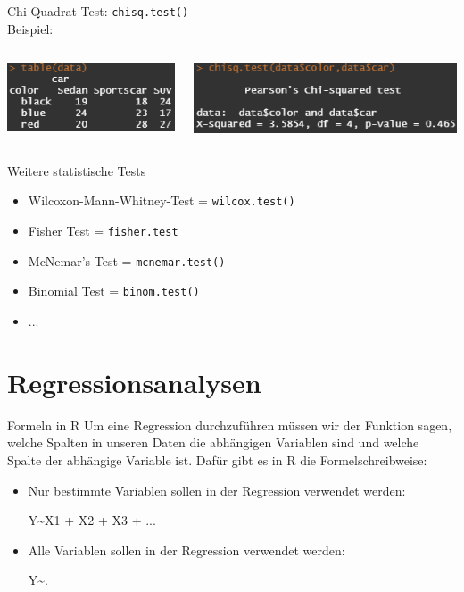 \documentclass[xcolor=dvipsnames, aspectratio = 169]{beamer}
\begin{document}
\begin{frame}[fragile]{Chi-Quadrat Test:}	
	\verb +chisq.test()+ \\

	Beispiel: \\
	\begin{columns}[T]
		\begin{column}{0.4\textwidth}
			\includegraphics{tabledata}
		\end{column}
		\begin{column}{0.6\textwidth}
			\includegraphics{chisq}
		\end{column}
	\end{columns}
\end{frame}


\begin{frame}[fragile]{Weitere statistische Tests}
	\begin{itemize}
		\item Wilcoxon-Mann-Whitney-Test = \verb+wilcox.test()+
		\item Fisher Test = \verb+fisher.test+
		\item McNemar's Test = \verb+mcnemar.test()+
		\item Binomial Test = \verb+binom.test()+
		\item ...
	\end{itemize}
\end{frame}

\section{Regressionsanalysen}

\begin{frame}[fragile]{Formeln in R}
	Um eine Regression durchzuführen müssen wir der Funktion sagen, welche Spalten in unseren Daten die abhängigen Variablen sind und welche Spalte der abhängige Variable ist. Dafür gibt 	es in R die Formelschreibweise:
	\begin{itemize}
		\item Nur bestimmte Variablen sollen in der Regression verwendet werden:
			\begin{center}
				Y\textasciitilde X1 + X2 + X3 + ... 
			\end{center}
		\item Alle Variablen sollen in der Regression verwendet werden:
			\begin{center}
				Y\textasciitilde.
			\end{center}
	\end{itemize}
\end{frame}
\end{document}
